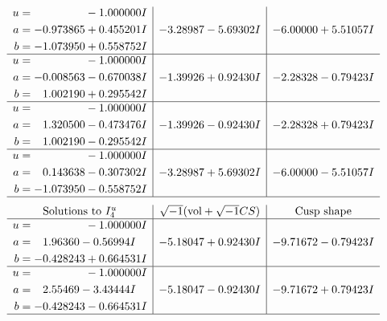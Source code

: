 \documentclass[1p]{elsarticle_modified}
\theoremstyle{definition}
\newcommand{\I}{\sqrt{-1}}
\begin{document}
$$\begin{array}{c|c|c}
\begin{aligned}
u &= \phantom{-0.000000 } -1.000000 I \\
a &= -0.973865 + 0.455201 I \\
b &= -1.073950 + 0.558752 I\end{aligned}
 & -3.28987 - 5.69302 I & -6.00000 + 5.51057 I \\ \hline\begin{aligned}
u &= \phantom{-0.000000 } -1.000000 I \\
a &= -0.008563 - 0.670038 I \\
b &= \phantom{-}1.002190 + 0.295542 I\end{aligned}
 & -1.39926 + 0.92430 I & -2.28328 - 0.79423 I \\ \hline\begin{aligned}
u &= \phantom{-0.000000 } -1.000000 I \\
a &= \phantom{-}1.320500 - 0.473476 I \\
b &= \phantom{-}1.002190 - 0.295542 I\end{aligned}
 & -1.39926 - 0.92430 I & -2.28328 + 0.79423 I \\ \hline\begin{aligned}
u &= \phantom{-0.000000 } -1.000000 I \\
a &= \phantom{-}0.143638 - 0.307302 I \\
b &= -1.073950 - 0.558752 I\end{aligned}
 & -3.28987 + 5.69302 I & -6.00000 - 5.51057 I\\
 \hline 
 \end{array}$$\newpage$$\begin{array}{c|c|c}  
\text{Solutions to }I^u_{4}& \I (\text{vol} + \sqrt{-1}CS) & \text{Cusp shape}\\
 \hline 
\begin{aligned}
u &= \phantom{-0.000000 } -1.000000 I \\
a &= \phantom{-}1.96360 - 0.56994 I \\
b &= -0.428243 + 0.664531 I\end{aligned}
 & -5.18047 + 0.92430 I & -9.71672 - 0.79423 I \\ \hline\begin{aligned}
u &= \phantom{-0.000000 } -1.000000 I \\
a &= \phantom{-}2.55469 - 3.43444 I \\
b &= -0.428243 - 0.664531 I\end{aligned}
 & -5.18047 - 0.92430 I & -9.71672 + 0.79423 I\\
 \hline 
 \end{array}$$\newpage\newpage\renewcommand{\arraystretch}{1}
\end{document}

